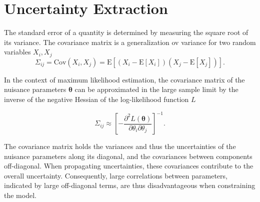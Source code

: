 \section{Uncertainty Extraction}
The standard error of a quantity is determined by measuring the square root of its variance. The covariance matrix is a generalization ov variance for two random variables $X_i, X_j$
\begin{equation}
    \Sigma_{ij}=\text{Cov}(X_i, X_j) = \text{E}[(X_i - \text{E}[X_i])(X_j - \text{E}[X_j])].
\end{equation}

In the context of maximum likelihood estimation, the covariance matrix of the nuisance parameters \( \bm{\theta} \) can be approximated in the large sample limit by the inverse of the negative Hessian of the log-likelihood function $L$

\begin{equation}
    \Sigma_{ij} \approx \left[ -\frac{\partial^2 L(\bm{\theta})}{\partial \theta_i \partial \theta_j} \right]^{-1}.
\end{equation}

The covariance matrix holds the variances and thus the uncertainties of the nuisance parameters along its diagonal, and the covariances between components off-diagonal. When propagating uncertainties, these covariances contribute to the overall uncertainty. Consequently, large correlations between parameters, indicated by large off-diagonal terms, are thus disadvantageous when constraining the model.
